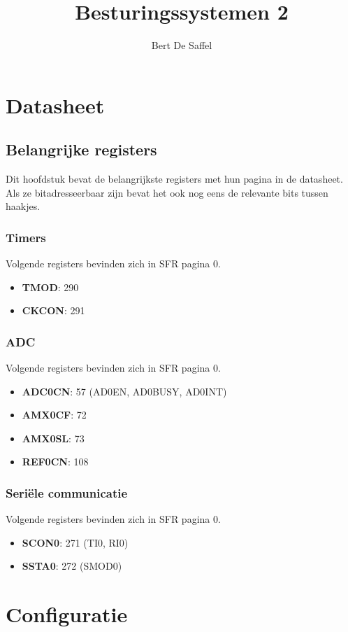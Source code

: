 \documentclass{report}
\title{Besturingssystemen 2}
\author{Bert De Saffel}
\begin{document}
\maketitle
\tableofcontents

\part{Datasheet}
\chapter{Belangrijke registers}
Dit hoofdstuk bevat de belangrijkste registers met hun pagina in de datasheet. Als ze bitadresseerbaar zijn bevat het ook nog eens de relevante bits tussen haakjes.
\section{Timers}
Volgende registers bevinden zich in SFR pagina 0.
\begin{itemize}
\item \textbf{TMOD}: 290
\item \textbf{CKCON}: 291
\end{itemize}

\section{ADC}
Volgende registers bevinden zich in SFR pagina 0.
\begin{itemize}
\item \textbf{ADC0CN}: 57    (AD0EN, AD0BUSY, AD0INT)
\item \textbf{AMX0CF}: 72  
\item \textbf{AMX0SL}: 73
\item \textbf{REF0CN}: 108
\end{itemize}

\section{Seriële communicatie}
Volgende registers bevinden zich in SFR pagina 0.
\begin{itemize}
\item \textbf{SCON0}: 271    (TI0, RI0)
\item \textbf{SSTA0}: 272    (SMOD0)
\end{itemize}

\part{Configuratie}
\end{document}
